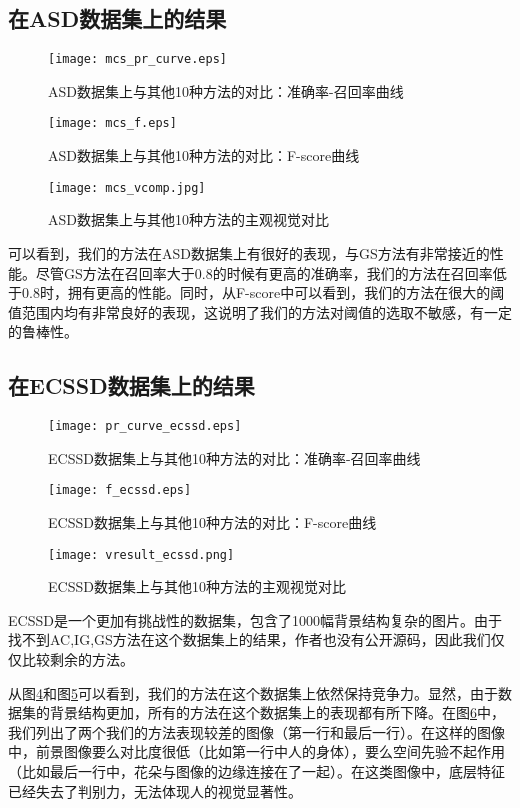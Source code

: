 \subsection{在ASD数据集上的结果}
\begin{figure}
\centering
\texttt{[image: mcs\_pr\_curve.eps]}
\caption{ASD数据集上与其他10种方法的对比：准确率-召回率曲线}
\label{fig:results2_pr}
\end{figure}
\begin{figure}
\centering
\texttt{[image: mcs\_f.eps]}
\caption{ASD数据集上与其他10种方法的对比：F-score曲线}
\label{fig:results2_fscore}
\end{figure}
\begin{figure}
\centering
\texttt{[image: mcs\_vcomp.jpg]}
\caption{ASD数据集上与其他10种方法的主观视觉对比}\label{fig:vresult2}
\end{figure}
可以看到，我们的方法在ASD数据集上有很好的表现，与GS方法有非常接近的性能。尽管GS方法在召回率大于0.8的时候有更高的准确率，我们的方法在召回率低于0.8时，拥有更高的性能。同时，从F-score中可以看到，我们的方法在很大的阈值范围内均有非常良好的表现，这说明了我们的方法对阈值的选取不敏感，有一定的鲁棒性。

\subsection{在ECSSD数据集上的结果}
\begin{figure}
\centering
\texttt{[image: pr\_curve\_ecssd.eps]}
\caption{ECSSD数据集上与其他10种方法的对比：准确率-召回率曲线}
\label{fig:results2_pr_ecssd}
\end{figure}
\begin{figure}
\centering
\texttt{[image: f\_ecssd.eps]}
\caption{ECSSD数据集上与其他10种方法的对比：F-score曲线}
\label{fig:results2_fscore_ecssd}
\end{figure}
\begin{figure}
\centering
\texttt{[image: vresult\_ecssd.png]}
\caption{ECSSD数据集上与其他10种方法的主观视觉对比}\label{fig:vresult2_ecssd}
\end{figure}
ECSSD是一个更加有挑战性的数据集，包含了1000幅背景结构复杂的图片。由于找不到AC,IG,GS方法在这个数据集上的结果，作者也没有公开源码，因此我们仅仅比较剩余的方法。

从图\ref{fig:results2_pr_ecssd}和图\ref{fig:results2_fscore_ecssd}可以看到，我们的方法在这个数据集上依然保持竞争力。显然，由于数据集的背景结构更加，所有的方法在这个数据集上的表现都有所下降。在图\ref{fig:vresult2_ecssd}中，我们列出了两个我们的方法表现较差的图像（第一行和最后一行）。在这样的图像中，前景图像要么对比度很低（比如第一行中人的身体），要么空间先验不起作用（比如最后一行中，花朵与图像的边缘连接在了一起）。在这类图像中，底层特征已经失去了判别力，无法体现人的视觉显著性。


